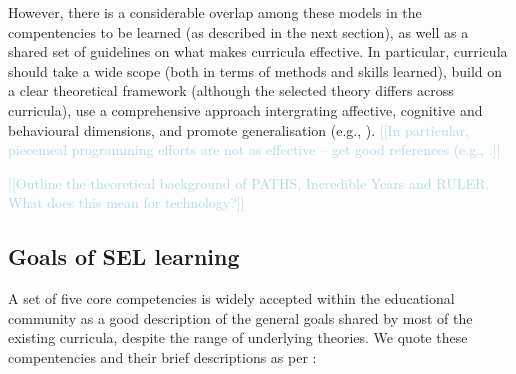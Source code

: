 \documentclass[prodmode,acmtochi]{acmsmall}
\newcommand{\todo}[1]{\textrm{\textrm{\textcolor{LightBlue}{[[#1]]} } } }
\begin{document}
However, there is a considerable overlap among these models in the compentencies to be learned (as described in the next section), as well as a shared set of guidelines on what makes curricula effective. In particular, curricula should take a wide scope (both in terms of methods and skills learned), build on a clear theoretical framework (although the selected theory differs across curricula), use a comprehensive approach intergrating affective, cognitive and behavioural dimensions, and promote generalisation (e.g., \cite[p.119]{Elias1997}). \todo{In particular, piecemeal programming efforts are not as effective -- get good references (e.g., \cite[p.13]{Zins2004}.}


\todo{Outline the theoretical background of PATHS, Incredible Years and RULER. What does this mean for technology?}







\subsection{Goals of SEL learning}
\label{sec:blocks}



%

A set of five core competencies is widely accepted within the educational community \cite{Zins2007,Durlak2011,CASEL2003,CASEL2013} as a good description of the general goals shared by most of the existing curricula, despite the range of underlying theories. We quote these compentencies and their brief descriptions as per :
%
\end{document}
